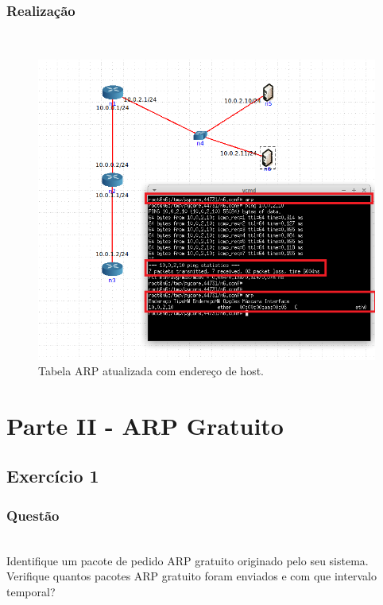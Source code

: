 \documentclass{llncs}
\begin{document}
\subsubsection{Realização}\rule[-10pt]{0pt}{10pt}\\

\begin{figure}
  \begin{center}
    \includegraphics[scale=0.6]{./imagens/5.20.png} 
  \end{center}
  \caption{Tabela ARP atualizada com endereço de host.}
  \label{fig:arp_reply_resp}
\end{figure} 

\clearpage
\section{Parte II - ARP Gratuito}

\subsection{Exercício 1}
\subsubsection{Questão}\rule[-10pt]{0pt}{10pt}\\

Identifique um pacote de pedido ARP gratuito originado pelo seu sistema. Verifique quantos pacotes ARP gratuito foram enviados e com que intervalo temporal?
\end{document}
